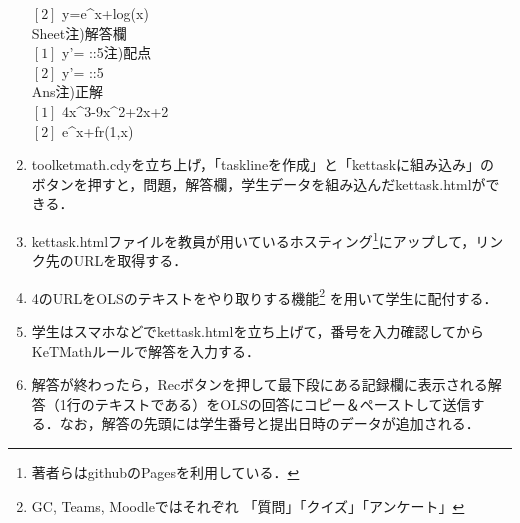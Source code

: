 \documentclass[a4j,12pt]{ujarticle}
\begin{document}
\begin{enumerate}
\begin{minipage}[t]{68mm}
\hspace*{2zw}$[2]$ y=e{}\^{}x+log(x)\\
\hspace*{2zw}Sheet\hfill{\small 注)解答欄}\\
\hspace*{2zw}$[1]$ y'=  ::5\hfill{\small 注)配点}\\
\hspace*{2zw}$[2]$ y'=  ::5\\
\hspace*{2zw}Ans\hfill{\small 注)正解}\\
\hspace*{2zw}$[1]$ 4x\^{}3-9x\^{}2+2x+2\\
\hspace*{2zw}$[2]$ e{}\^{}x+fr(1,x)\\
\end{minipage}\vspace{-2mm}

\item toolketmath.cdyを立ち上げ，「tasklineを作成」と「kettaskに組み込み」の
ボタンを押すと，問題，解答欄，学生データを組み込んだkettask.htmlができる．\vspace{-2mm}
\item kettask.htmlファイルを教員が用いているホスティング\footnote{著者らはgithubのPagesを利用している．}にアップして，リンク先のURLを取得する．\vspace{-2mm}
\item 4のURLをOLSのテキストをやり取りする機能\footnote{GC, Teams, Moodleではそれぞれ
「質問」「クイズ」「アンケート」} を用いて学生に配付する．\vspace{-2mm}
\item 学生はスマホなどでkettask.htmlを立ち上げて，番号を入力確認してからKeTMathルールで解答を入力する．\vspace{-2mm}
\item 解答が終わったら，Recボタンを押して最下段にある記録欄に表示される解答（1行のテキストである）をOLSの回答にコピー＆ペーストして送信する．なお，解答の先頭には学生番号と提出日時のデータが追加される．\vspace{-1mm}
\end{enumerate}
\end{document}
